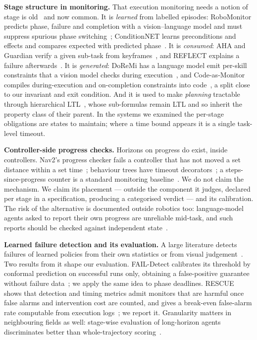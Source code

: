 \documentclass[letterpaper, 10pt, journal, twoside]{IEEEtran}
\begin{document}
\textbf{Stage structure in monitoring.} That execution monitoring needs
a notion of stage is old~\cite{pettersson2005execution,degiacomo1998execution}
and now common. It is \emph{learned} from labelled episodes: RoboMonitor
predicts phase, failure and completion with a vision--language model and
must suppress spurious phase switching~\cite{ajith2026robomonitor};
ConditionNET learns preconditions and effects and compares expected with
predicted phase~\cite{sliwowski2025conditionnet}. It is \emph{consumed}:
AHA and Guardian verify a given sub-task from
keyframes~\cite{duan2025aha,pacaud2025guardian}, and REFLECT explains a
failure afterwards~\cite{liu2023reflect}. It is \emph{generated}: DoReMi
has a language model emit per-skill constraints that a vision model
checks during execution~\cite{guo2024doremi}, and Code-as-Monitor
compiles during-execution and on-completion constraints into
code~\cite{zhou2024codeasmonitor}, a split close to our invariant and
exit condition. And it is used to make \emph{planning} tractable through
hierarchical LTL~\cite{xu2024nl2hltl2plan}, whose sub-formulas remain
LTL and so inherit the property class of their parent. In the systems we
examined the per-stage obligations are states to maintain; where a time
bound appears it is a single task-level timeout.

\textbf{Controller-side progress checks.} Horizons on progress do exist,
inside controllers. Nav2's progress checker fails a controller that has
not moved a set distance within a set
time~\cite{macenski2020marathon}; behaviour trees have timeout
decorators~\cite{colledanchise2018behavior}; a steps-since-progress
counter is a standard monitoring
baseline~\cite{ahmedt2026rescue}. We do not claim the mechanism. We
claim its placement --- outside the component it judges, declared per
stage in a specification, producing a categorised verdict --- and its
calibration. The risk of the alternative is documented outside robotics
too: language-model agents asked to report their own progress are
unreliable mid-task, and such reports should be checked against
independent state~\cite{wang2026progressbar}.

\textbf{Learned failure detection and its evaluation.} A large
literature detects failures of learned policies from their own
statistics or from visual
judgement~\cite{agia2024unpacking,periasami2026frames}. Two results from
it shape our evaluation. FAIL-Detect calibrates its threshold by
conformal prediction on successful runs only, obtaining a false-positive
guarantee without failure data~\cite{xu2025faildetect}; we apply the
same idea to phase deadlines. RESCUE shows that detection and timing
metrics admit monitors that are harmful once false alarms and
intervention cost are counted, and gives a break-even false-alarm rate
computable from execution logs~\cite{ahmedt2026rescue}; we report it.
Granularity matters in neighbouring fields as well: stage-wise
evaluation of long-horizon agents discriminates better than
whole-trajectory scoring~\cite{shi2026dynsteer}.
\end{document}
